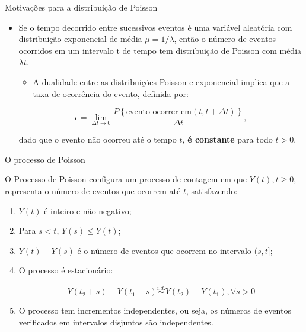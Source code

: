 \documentclass[10pt, aspectratio=169]{beamer}
\begin{document}
\begin{frame}{Motivações para a distribuição de Poisson}

\begin{itemize}
    

        \item Se o tempo decorrido entre sucessivos eventos é uma variável aleatória com distribuição exponencial de média $\mu=1/\lambda$, então o número de eventos ocorridos em um intervalo t de tempo tem distribuição de Poisson com média $\lambda t$.
        
         \vspace{0,3cm}
         
\begin{itemize}    
        
        \item A dualidade entre as distribuições Poisson e exponencial implica que a taxa de ocorrência do evento, definida por:
        
        
\end{itemize}

    
$$
    \epsilon =\lim_{\Delta t\rightarrow 0}\frac{P\left \{ \text{evento ocorrer em} \left ( t,t+\Delta t \right ) \right \}}{\Delta t},
$$  

     \vspace{0,3cm}
     
dado que o evento não ocorreu até o tempo $t$, \textbf{é constante} para todo $t>0$.

        
         \end{itemize}
    
\end{frame}   




\begin{frame}{O processo de Poisson}
    
    O Processo de Poisson configura um processo de contagem em que $Y(t),t\geqslant 0$, representa o número de eventos que ocorrem até $t$, satisfazendo:
    
    \vspace{0,5cm}
    
    \begin{enumerate}
        \item $Y(t)$ é inteiro e não negativo;
        \item Para $s<t$, $Y(s)\leq Y(t)$;
        \item $Y(t)-Y(s)$ é o número de eventos que ocorrem no intervalo $(s,t]$;
        \item O processo é estacionário:
        
        $$
            Y(t_{2}+s)-Y(t_{1}+s) \overset{i.d. }{\sim}Y(t_{2})-Y(t_{1}), \forall s>0
       $$
        
        \item O processo tem incrementos independentes, ou seja, os números de eventos verificados em intervalos disjuntos são independentes.
    \end{enumerate}

\end{frame}
\end{document}
